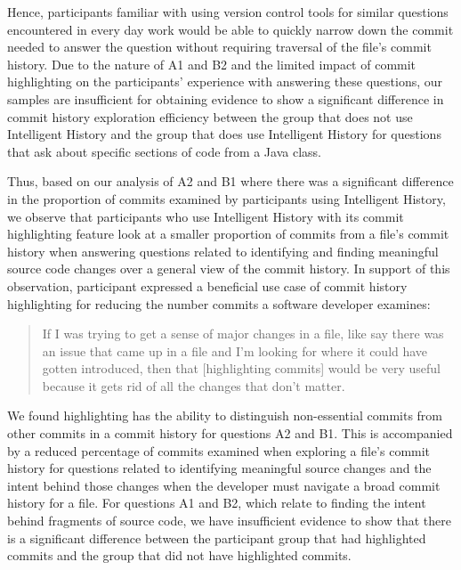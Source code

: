 \begin{center}
\end{center}

Hence, participants familiar with using version control tools for similar questions encountered 
in every day work would be able to quickly narrow down the commit needed to answer 
the question without requiring traversal of the file's commit history.
Due to the nature of A1 and B2 and the limited impact of commit highlighting 
on the participants' experience with answering these questions,
our samples are insufficient for obtaining evidence to show a significant difference in 
commit history exploration efficiency between the group that does not use Intelligent History 
and the group that does use Intelligent History for questions that ask about specific sections of code from a Java class.

Thus, based on our analysis of A2 and B1 where there was a significant difference in 
the proportion of commits examined by participants using Intelligent History, 
we observe that participants who use Intelligent History with its commit highlighting feature 
look at a smaller proportion of commits from a file's commit history when answering questions related to
identifying and finding meaningful source code changes over a general view of the commit history.
In support of this observation, 
participant  expressed a beneficial use case of commit history highlighting 
for reducing the number commits a software developer examines:

\begin{quote}
  If I was trying to get a sense of major changes in a file, like say there was an issue that came up in a file and I’m looking for where it could have gotten introduced, 
  then that [highlighting commits] would be very useful because it gets rid of all the changes that don’t matter. 
\end{quote}

We found highlighting has the ability to distinguish non-essential commits from other commits in a commit history
for questions A2 and B1.
This is accompanied by a reduced percentage of commits examined when exploring a file's commit history 
for questions related to identifying meaningful source changes 
and the intent behind those changes when the developer must navigate a broad commit history for a file. 
For questions A1 and B2, which relate to finding the intent behind fragments of source code,
we have insufficient evidence to show that there is a significant difference
between the participant group that had highlighted commits and the group that did not have highlighted commits.

